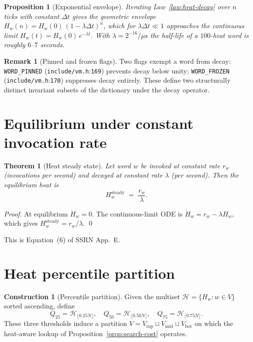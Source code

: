 \documentclass[11pt,letterpaper,openany]{book}
\theoremstyle{definition}
\newtheorem{remark}[definition]{Remark}
\newtheorem{construction}[definition]{Construction}
\theoremstyle{plain}
\newtheorem{theorem}[definition]{Theorem}
\newtheorem{proposition}[definition]{Proposition}
\newcommand{\sourceref}[2]{\texttt{#1}:\texttt{#2}}
\begin{document}
\begin{proposition}[Exponential envelope]\label{prop:exp-env}
Iterating Law~\ref{law:heat-decay} over $n$ ticks with constant $\Delta t$
gives the geometric envelope
$H_w(n) = H_w(0)\,(1-\lambda\Delta t)^n$, which for $\lambda\Delta t\ll 1$
approaches the continuous limit $H_w(t) = H_w(0)\,e^{-\lambda t}$. With
$\lambda = 2^{-16}/\mu\text{s}$ the half-life of a $100$-heat word is
roughly $6$--$7$ seconds.
\end{proposition}

\begin{remark}[Pinned and frozen flags]
Two flags exempt a word from decay:
\texttt{WORD\_PINNED} (\sourceref{include/vm.h}{169}) prevents decay below
unity; \texttt{WORD\_FROZEN} (\sourceref{include/vm.h}{170}) suppresses
decay entirely. These define two structurally distinct invariant subsets
of the dictionary under the decay operator.
\end{remark}

\section{Equilibrium under constant invocation rate}

\begin{theorem}[Heat steady state]\label{thm:heat-steady}
Let word $w$ be invoked at constant rate $r_w$ (invocations per second)
and decayed at constant rate $\lambda$ (per second). Then the equilibrium
heat is
\[
  H_w^{\mathrm{steady}} \;=\; \frac{r_w}{\lambda}.
\]
\end{theorem}

\begin{proof}
At equilibrium $\dot H_w = 0$. The continuous-limit ODE is
$\dot H_w = r_w - \lambda H_w$, which gives $H_w^{\mathrm{steady}} = r_w/\lambda$.
\qed
\end{proof}

This is Equation~(6) of SSRN App.~E.

\section{Heat percentile partition}

\begin{construction}[Percentile partition]
Given the multiset $\mathcal{H} = \{H_w : w\in V\}$ sorted ascending, define
\[
  Q_{25} = \mathcal{H}_{\lfloor 0.25 N\rfloor},\quad
  Q_{50} = \mathcal{H}_{\lfloor 0.50 N\rfloor},\quad
  Q_{75} = \mathcal{H}_{\lfloor 0.75 N\rfloor}.
\]
These three thresholds induce a partition $V = V_{\mathrm{top}}\sqcup V_{\mathrm{mid}}\sqcup V_{\mathrm{bot}}$
on which the heat-aware lookup
of Proposition~\ref{prop:search-cost} operates.
\end{construction}
\end{document}
